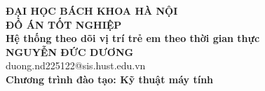 \documentclass[DoAn.tex]{subfiles}
\begin{document}
\begin{titlepage}
\thispagestyle{empty}
\begin{center}

{\textbf{\large{ĐẠI HỌC BÁCH KHOA HÀ NỘI}}}\\[4cm]

{\textbf{\huge{ ĐỒ ÁN TỐT NGHIỆP}}}\\[1cm]
{\textbf{\Large{Hệ thống theo dõi vị trí trẻ em theo thời gian thực}}}\\[1cm]

{\textbf{\large{NGUYỄN ĐỨC DƯƠNG}}}\\
{\large{duong.nd225122@sis.hust.edu.vn}}\\[0.5cm]

{\textbf{\large{Chương trình đào tạo: Kỹ thuật máy tính
}}}\\

\vspace{4cm}
\begin{table}[H]
\centering
{}
\end{table}
\end{center}



\end{titlepage}
\end{document}
